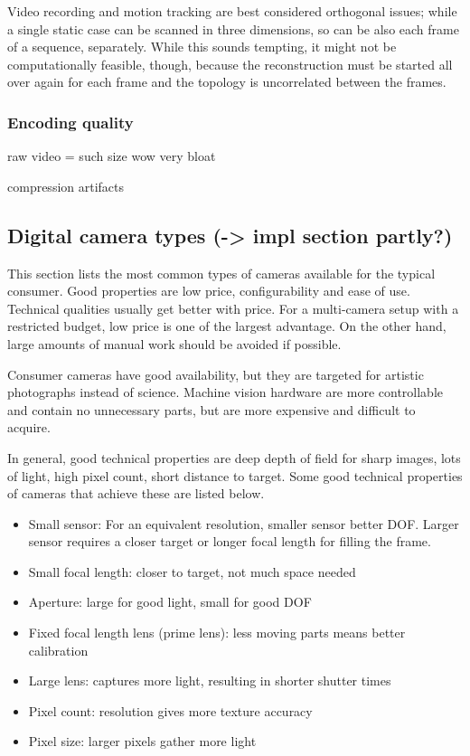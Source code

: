 Video recording and motion tracking are best considered orthogonal issues; while a single static case can be scanned in three dimensions, so can be also each frame of a sequence, separately.
While this sounds tempting, it might not be computationally feasible, though, because the reconstruction must be started all over again for each frame and the topology is uncorrelated between the frames.



\subsubsection{Encoding quality} %

raw video = such size wow very bloat

compression artifacts


\subsection{Digital camera types (-> impl section partly?)} %

This section lists the most common types of cameras available for the typical consumer.
Good properties are low price, configurability and ease of use.
Technical qualities usually get better with price.
For a multi-camera setup with a restricted budget, low price is one of the largest advantage.
On the other hand, large amounts of manual work should be avoided if possible.

Consumer cameras have good availability, but they are targeted for artistic photographs instead of science.
Machine vision hardware are more controllable and contain no unnecessary parts, but are more expensive and difficult to acquire.

In general, good technical properties are deep depth of field for sharp images, lots of light, high pixel count, short distance to target. Some good technical properties of cameras that achieve these are listed below.

\begin{itemize}
	\item Small sensor: For an equivalent resolution, smaller sensor better DOF. Larger sensor requires a closer target or longer focal length for filling the frame.
	\item Small focal length: closer to target, not much space needed
	\item Aperture: large for good light, small for good DOF
	\item Fixed focal length lens (prime lens): less moving parts means better calibration
	\item Large lens: captures more light, resulting in shorter shutter times
	\item Pixel count: resolution gives more texture accuracy
	\item Pixel size: larger pixels gather more light
\end{itemize}

